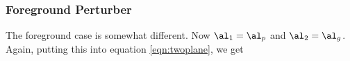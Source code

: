 \subsubsection{Foreground Perturber}
\label{sec:foreground}
The foreground case is somewhat different. Now $\al_1 = \al_p$ and $\al_2 = \al_g$. Again, putting this into equation \ref{eqn:twoplane}, we get
  
  
